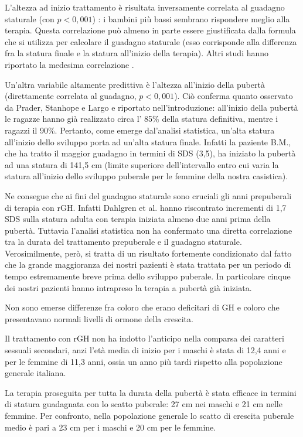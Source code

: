 L'altezza ad inizio trattamento è risultata inversamente correlata al guadagno staturale (con $p < 0,001$) : i bambini più bassi sembrano rispondere meglio alla terapia. Questa correlazione può almeno in parte essere giustificata dalla formula che si utilizza per calcolare il guadagno staturale (esso corrisponde alla differenza fra la statura finale e la statura all'inizio della terapia). Altri studi hanno riportato la medesima correlazione\cite{de2005growth} \cite{de2000growth}.

Un'altra variabile altamente predittiva è l'altezza all'inizio della pubertà (direttamente correlata al guadagno, $p < 0,001$). Ciò conferma quanto osservato da Prader, Stanhope e Largo  e riportato nell'introduzione: 
 all'inizio della pubertà le ragazze hanno già realizzato circa l' 85\% della statura definitiva, mentre i ragazzi il 90\%. Pertanto, come emerge dal'analisi statistica, un'alta statura all'inizio dello sviluppo porta ad un'alta statura finale. Infatti la paziente B.M., che ha tratto il maggior guadagno in termini di SDS (3,5), ha iniziato la pubertà ad una statura di 141,5 cm (limite superiore dell'intervallo entro cui varia la statura all'inizio dello sviluppo puberale per le femmine della nostra casistica). 

Ne consegue che ai fini del guadagno staturale sono cruciali gli anni prepuberali di terapia con rGH. Infatti Dahlgren et al. hanno riscontrato incrementi di 1,7 SDS sulla statura adulta con terapia iniziata almeno due anni prima della pubertà\cite{dahlgren2005final}. Tuttavia l'analisi statistica non ha confermato una diretta correlazione tra la durata del trattamento prepuberale e il guadagno staturale. Verosimilmente, però, si tratta di un risultato fortemente condizionato dal fatto che la grande maggioranza dei nostri pazienti è stata trattata per un periodo di tempo estremamente breve prima dello sviluppo puberale. In particolare cinque dei nostri pazienti hanno intrapreso la terapia a pubertà già iniziata.

Non sono emerse differenze fra coloro che erano deficitari di GH  e coloro che presentavano normali livelli di ormone della crescita.

Il trattamento con rGH non ha indotto l'anticipo nella comparsa dei caratteri sessuali secondari, anzi l'età media di inizio per i maschi è stata di 12,4 anni e per le femmine di 11,3 anni, ossia un anno più tardi rispetto alla popolazione generale italiana\cite{benso1989distribution}.

La terapia proseguita per tutta la durata della pubertà è stata efficace in termini di statura guadagnata con lo scatto puberale: 27 cm nei maschi e 21 cm nelle femmine. Per confronto, nella popolazione generale lo scatto di crescita puberale medio è pari a 23 cm per i maschi e 20 cm per le femmine\cite{tanner1990foetus}. 

